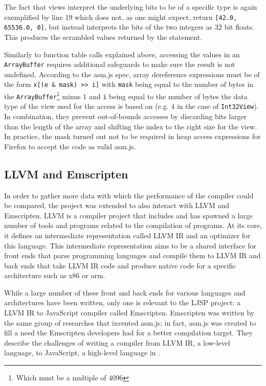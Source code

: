 \documentclass[11pt]{report}
\begin{document}
The fact that views interpret the underlying bits to be of a specific type is again exemplified by line 19 which does not, as one might expect, return \texttt{[42.0, 65536.0, 0]}, but instead interprets the bits of the two integers as 32 bit floats. This produces the scrambled values returned by the statement.

Similarly to function table calls explained above, accessing the values in an \texttt{ArrayBuffer} requires additional safeguards to make sure the result is not undefined. According to the asm.js spec, array dereference expressions must be of the form \texttt{x[(e \& mask) {>}> i]} with \texttt{mask} being equal to the number of bytes in the \texttt{ArrayBuffer}\footnote{Which must be a multiple of $4096$} minus $1$ and \texttt{i} being equal to the number of bytes the data type of the view used for the access is based on (e.g. $4$ in the case of \texttt{Int32View}). In combination, they prevent out-of-bounds accesses by discarding bits larger than the length of the array and shifting the index to the right size for the view. In practice, the mask turned out not to be required in heap access expressions for Firefox to accept the code as valid asm.js.

\subsection{LLVM and Emscripten}
In order to gather more data with which the performance of the compiler could be compared, the project was extended to also interact with LLVM and Emscripten. LLVM is a compiler project that includes and has spawned a large number of tools and programs related to the compilation of programs. At its core, it defines an intermediate representation called LLVM IR and an optimizer for this language. This intermediate representation aims to be a shared interface for front ends that parse programming languages and compile them to LLVM IR and back ends that take LLVM IR code and produce native code for a specific architecture such as x86 or arm. 

While a large number of these front and back ends for various languages and architectures have been written, only one is relevant to the LJSP project: a LLVM IR to JavaScript compiler called Emscripten. Emscripten was written by the same group of researches that invented asm.js; in fact, asm.js was created to fill a need the Emscripten developers had for a better compilation target. They describe the challenges of writing a compiler from LLVM IR, a low-level language, to JavaScript, a high-level language in \cite{Zakai:2011:ELC:2048147.2048224}.
\end{document}
